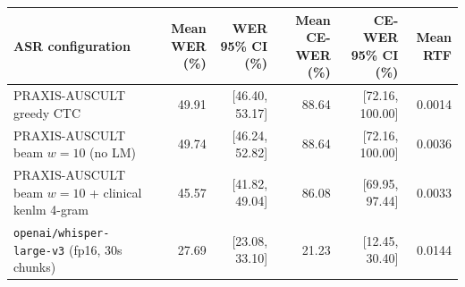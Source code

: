 
\begin{tabular}{lrrrrr}
\toprule
ASR configuration & Mean WER (\%) & WER 95\% CI (\%) & Mean CE-WER (\%) & CE-WER 95\% CI (\%) & Mean RTF \\
\midrule
PRAXIS-AUSCULT greedy CTC                                & 49.91 & [46.40, 53.17]   & 88.64 & [72.16, 100.00] & 0.0014 \\
PRAXIS-AUSCULT beam $w=10$ (no LM)                       & 49.74 & [46.24, 52.82]   & 88.64 & [72.16, 100.00] & 0.0036 \\
PRAXIS-AUSCULT beam $w=10$ + clinical kenlm 4-gram       & 45.57 & [41.82, 49.04]   & 86.08 & [69.95, 97.44]  & 0.0033 \\
\texttt{openai/whisper-large-v3} (fp16, 30s chunks)      & 27.69 & [23.08, 33.10]   & 21.23 & [12.45, 30.40]  & 0.0144 \\
\bottomrule
\end{tabular}
